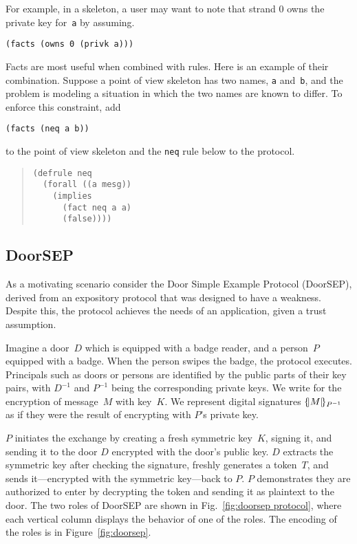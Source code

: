 \documentclass[12pt]{article}
\newcommand{\iv}[1]{\ensuremath{{#1}^{-1}}}
\begin{document}
For example, in a skeleton, a user may want to note that strand 0 owns
the private key for~\texttt{a} by assuming.

\begin{center}
  \verb|(facts (owns 0 (privk a)))|
\end{center}

Facts are most useful when combined with rules.  Here is an example of
their combination.  Suppose a point of view skeleton has two names,
\texttt{a} and~\texttt{b}, and the problem is modeling a situation in
which the two names are known to differ.  To enforce this constraint, add
\begin{center}
  \verb|(facts (neq a b))|
\end{center}
to the point of view skeleton and the \texttt{neq} rule below to the
protocol.

\begin{quote}
\begin{verbatim}
(defrule neq
  (forall ((a mesg))
    (implies
      (fact neq a a)
      (false))))
\end{verbatim}
\end{quote}

\subsection{DoorSEP}

\begin{sloppypar}
As a motivating scenario consider the Door Simple Example Protocol
(DoorSEP), derived from an expository protocol that was designed to
have a weakness.  Despite this, the protocol achieves the needs of an
application, given a trust assumption.
\end{sloppypar}

Imagine a door~$D$ which is equipped with a badge reader, and a
person~$P$ equipped with a badge.  When the person swipes the badge,
the protocol executes.  Principals such as doors or persons are
identified by the public parts of their key pairs, with \iv{D} and
\iv{P} being the corresponding private keys.  We write  for
the encryption of message~$M$ with key~$K$.  We represent digital
signatures $\enc{M}{\iv{P}}$ as if they were the result of encrypting
with $P$'s private key.

$P$ initiates the exchange by creating a fresh symmetric key~$K$,
signing it, and sending it to the door $D$ encrypted with the door's
public key.  $D$ extracts the symmetric key after checking the
signature, freshly generates a token~$T$, and sends it---encrypted
with the symmetric key---back to $P$.  $P$ demonstrates they are
authorized to enter by decrypting the token and sending it as
plaintext to the door.  The two roles of DoorSEP are shown in
Fig.~\ref{fig:doorsep protocol}, where each vertical column displays
the behavior of one of the roles.  The  encoding of the roles is
in Figure~\ref{fig:doorsep}.
\end{document}
